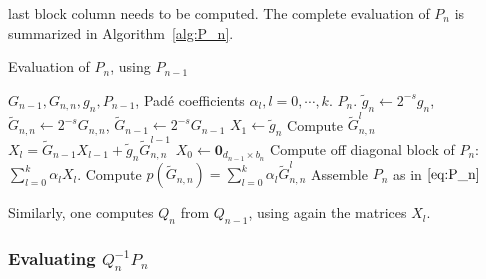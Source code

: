 last block column needs to be computed. The complete evaluation of $P_n$ is summarized in Algorithm~\ref{alg:P_n}.
\begin{algorithm}[ht]
    \caption{Evaluation of $P_n$, using $P_{n-1}$
    \label{alg:P_n}}
    \begin{algorithmic}[1]
        \REQUIRE $G_{n-1}, G_{n,n}, g_n, P_{n-1}$, Pad\'e coefficients $\alpha_l, l = 0, \cdots, k$.
        \ENSURE $P_n$.
        \STATE $\tilde{g}_n \leftarrow 2^{-s} g_n$,
            $\tilde{G}_{n,n} \leftarrow 2^{-s} G_{n,n}$,
	 $\tilde{G}_{n-1} \leftarrow 2^{-s} G_{n-1}$
        \STATE $X_1 \leftarrow \tilde{g}_n$
	\STATE Compute $\tilde{G}_{n,n}^l$
         	\STATE $X_l = \tilde{G}_{n-1} X_{l-1} + \tilde{g}_n \tilde{G}_{n,n}^{l-1}$
        \ENDFOR
        \STATE $X_0 \leftarrow \mathbf{0}_{d_{n-1} \times b_n}$
        \STATE Compute off diagonal block of $P_n$:  $\sum_{l=0}^{k} \alpha_l X_l$.
        \STATE Compute $p(\tilde{G}_{n,n}) = \sum_{l=0}^{k} \alpha_l \tilde{G}_{n,n}^l$
        \STATE Assemble $P_n$ as in $\eqref{eq:P_n}$
    \end{algorithmic}
\end{algorithm}

Similarly, one computes $Q_n$ from $Q_{n-1}$, using again the matrices
$X_l$.
\subsubsection{Evaluating $Q_n^{-1} P_n$}


